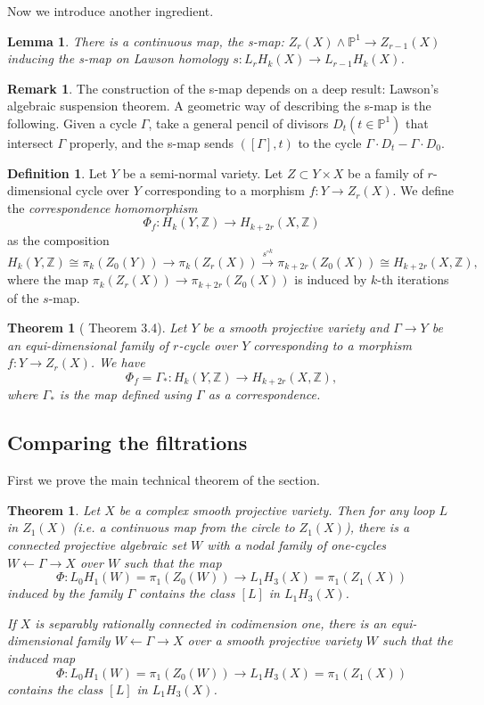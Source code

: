 \documentclass{amsart}
\newtheorem{thm}[theorem]{Theorem}
\newtheorem{lem}[theorem]{Lemma}
\theoremstyle{definition}
\newtheorem{defn}[theorem]{Definition}
\newtheorem{rem}[theorem]{Remark}
\theoremstyle{remark}
\newcommand{\mbb}{\mathbb}
\newcommand{\ZZ}{\mbb{Z}}
\newcommand{\PP}{\mbb{P}}
\begin{document}
Now we introduce another ingredient.
\begin{lem}\cite[Page 709, 1.2.1]{Friedlander_Mazur_AIF}\label{s-map}
There is a continuous map, the \emph{s-map}: $Z_r(X) \wedge \PP^1 \to Z_{r-1}(X)$ inducing the s-map on Lawson homology $s: L_rH_k(X) \to L_{r-1}H_k(X)$.
\end{lem}
\begin{rem}
The construction of the s-map depends on a deep result: Lawson's algebraic suspension theorem. A geometric way of describing the s-map is the following. Given a cycle $\Gamma$, take a general pencil of divisors $D_t (t \in \PP^1)$ that intersect $\Gamma$ properly, and the s-map sends $([\Gamma], t)$ to the cycle $\Gamma \cdot D_{t}-\Gamma \cdot D_0$.
\end{rem}

\begin{defn}
Let $Y$ be a semi-normal variety. Let $Z \subset Y \times X$ be a family of $r$-dimensional cycle over $Y$ corresponding to a morphism $f: Y \to Z_r(X)$. We define the \emph{correspondence homomorphism}
\[
\Phi_f: H_k(Y, \ZZ) \to H_{k+2r}(X, \ZZ)
\]
as the composition
\[
H_k(Y, \ZZ) \cong \pi_k(Z_0(Y)) \to \pi_k(Z_r(X)) \xrightarrow{s^{\circ k}} \pi_{k+2r}(Z_0(X)) \cong H_{k+2r}(X, \ZZ),
\]
where the map $\pi_k(Z_r(X)) \to \pi_{k+2r}(Z_0(X))$ is induced by $k$-th iterations of the $s$-map.
\end{defn}
\begin{thm}[\cite{Friedlander_Mazur_AIF} Theorem 3.4]\label{thm:corr}
Let $Y$ be a smooth projective variety and $\Gamma \to Y$ be an equi-dimensional family of $r$-cycle over $Y$ corresponding to a morphism $f: Y \to Z_r(X)$.
We have 
\[
\Phi_f=\Gamma_*: H_k(Y, \ZZ) \to H_{k+2r}(X, \ZZ),
\]
where $\Gamma_*$ is the map defined using $\Gamma$ as a correspondence.
\end{thm}


\subsection{Comparing the filtrations}
First we prove the main technical theorem of the section.
\begin{thm}\label{thm:surjectivity}
Let $X$ be a complex smooth projective variety.  Then for any loop $L$ in $Z_1(X)$ (i.e. a continuous map from the circle to $Z_1(X)$), there is a connected projective algebraic set $W$ with a nodal family of one-cycles $W \leftarrow \Gamma \to X$ over $W$ such that the map
\[
\Phi: L_0H_1(W)=\pi_1(Z_0(W)) \to L_1H_3(X)=\pi_1 (Z_1(X))
\] 
induced by the family $\Gamma$ contains the class $[L]$ in $L_1 H_3(X)$.

If  $X$ is separably rationally connected in codimension one, there is an equi-dimensional family $W \leftarrow \Gamma \to X$ over a smooth projective variety $W$ such that the induced map
\[
\Phi: L_0H_1(W)=\pi_1(Z_0(W)) \to L_1H_3(X)=\pi_1 (Z_1(X))
\] 
contains the class $[L]$ in $L_1 H_3(X)$.
\end{thm}
\end{document}
